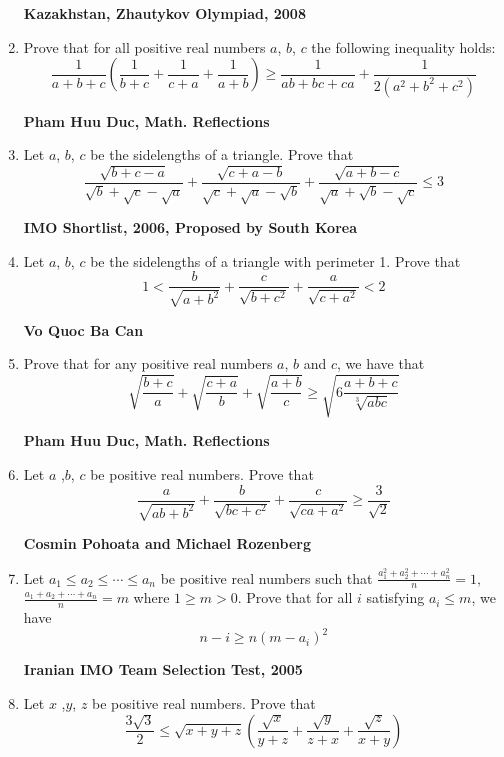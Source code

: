 \documentclass{article}
\begin{document}
\begin{enumerate}
\begin {flushright}
\textbf{Kazakhstan, Zhautykov Olympiad, 2008}
\end{flushright}
\item Prove that for all positive real numbers $a$, $b$, $c$ the following inequality holds: $$\frac{1}{a+b+c}\left(\frac{1}{b+c}+\frac{1}{c+a}+\frac{1}{a+b}\right)\geq \frac{1}{ab+bc+ca}+\frac{1}{2(a^2+b^2+c^2)}$$
\begin {flushright}
\textbf{Pham Huu Duc, Math. Reflections}
\end{flushright}
\item Let $a$, $b$, $c$ be the sidelengths of a triangle. Prove that $$\frac{\sqrt{b+c-a}}{\sqrt{b}+\sqrt{c}-\sqrt{a}}+\frac{\sqrt{c+a-b}}{\sqrt{c}+\sqrt{a}-\sqrt{b}}+\frac{\sqrt{a+b-c}}{\sqrt{a}+\sqrt{b}-\sqrt{c}}\leq 3$$
\begin {flushright}
\textbf{IMO Shortlist, 2006, Proposed by South Korea}
\end{flushright}
\item Let $a$, $b$, $c$ be the sidelengths of a triangle with perimeter 1. Prove that $$1<\frac{b}{\sqrt{a+b^2}}+\frac{c}{\sqrt{b+c^2}}+\frac{a}{\sqrt{c+a^2}}<2$$
\begin {flushright}
\textbf{Vo Quoc Ba Can}
\end{flushright}
\item Prove that for any positive real numbers $a$, $b$ and $c$, we have that $$\sqrt{\frac{b+c}{a}}+\sqrt{\frac{c+a}{b}}+\sqrt{\frac{a+b}{c}}\geq \sqrt{6\frac{a+b+c}{\sqrt[3]{abc}}}$$
\begin {flushright}
\textbf{Pham Huu Duc, Math. Reflections}
\end{flushright}
\item Let $a$ ,$b$, $c$ be positive real numbers. Prove that $$\frac{a}{\sqrt{ab+b^2}}+\frac{b}{\sqrt{bc+c^2}}+\frac{c}{\sqrt{ca+a^2}}\geq \frac{3}{\sqrt{2}}$$
\begin {flushright}
\textbf{Cosmin Pohoata and Michael Rozenberg}
\end{flushright}
\item Let $a_1 \leq a_2 \leq \cdots \leq a_n$ be positive real numbers such that $\displaystyle{\frac{a_1^2+a_2^2+\cdots +a_n^2}{n}}=1,$\\
$\displaystyle{\frac{a_1+a_2+\cdots +a_n}{n}}=m$ where $1 \geq m > 0$. Prove that for all $i$ satisfying $a_i \leq m$, we have $$n-i\geq n(m-a_i)^2$$
\begin {flushright}
\textbf{Iranian IMO Team Selection Test, 2005}
\end{flushright}
\item Let $x$ ,$y$, $z$ be positive real numbers. Prove that $$\frac{3\sqrt{3}}{2}\leq \sqrt{x+y+z}\left(\frac{\sqrt{x}}{y+z}+\frac{\sqrt{y}}{z+x}+\frac{\sqrt{z}}{x+y}\right)$$

\end{enumerate}
\end{document}
